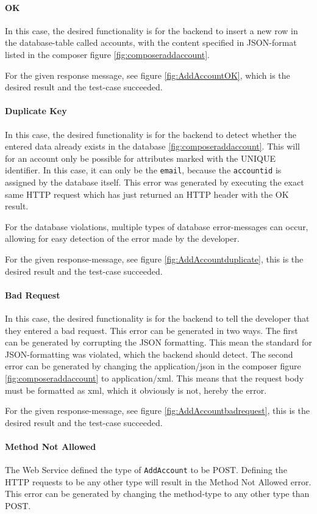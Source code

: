 \paragraph{OK}
In this case, the desired functionality is for the backend to insert a new row in the database-table called accounts, with the content specified in JSON-format listed in the composer figure \ref{fig:composeraddaccount}. 

For the given response message, see figure \ref{fig:AddAccountOK}, which is the desired result and the test-case succeeded.
\paragraph{Duplicate Key}
In this case, the desired functionality is for the backend to detect whether the entered data already exists in the database \ref{fig:composeraddaccount}. This will for an account only be possible for attributes marked with the UNIQUE identifier. In this case, it can only be the \texttt{email}, because the \texttt{accountid} is assigned by the database itself. This error was generated by executing the exact same HTTP request which has just returned an HTTP header with the OK result.

For the database violations, multiple types of database error-messages can occur, allowing for easy detection of the error made by the developer.

For the given response-message, see figure \ref{fig:AddAccountduplicate}, this is the desired result and the test-case succeeded.
\paragraph{Bad Request}
In this case, the desired functionality is for the backend to tell the developer that they entered a bad request. This error can be generated in two ways. The first can be generated by corrupting the JSON formatting. This mean the standard for JSON-formatting was violated, which the backend should detect. The second error can be generated by changing the application/json in the composer figure \ref{fig:composeraddaccount} to application/xml. This means that the request body must be formatted as xml, which it obviously is not, hereby the error.

For the given response-message, see figure \ref{fig:AddAccountbadrequest}, this is the desired result and the test-case succeeded.

\paragraph{Method Not Allowed}
The Web Service defined the type of \texttt{AddAccount} to be POST. Defining the HTTP requests to be any other type will result in the Method Not Allowed error. This error can be generated by changing the method-type to any other type than POST.


